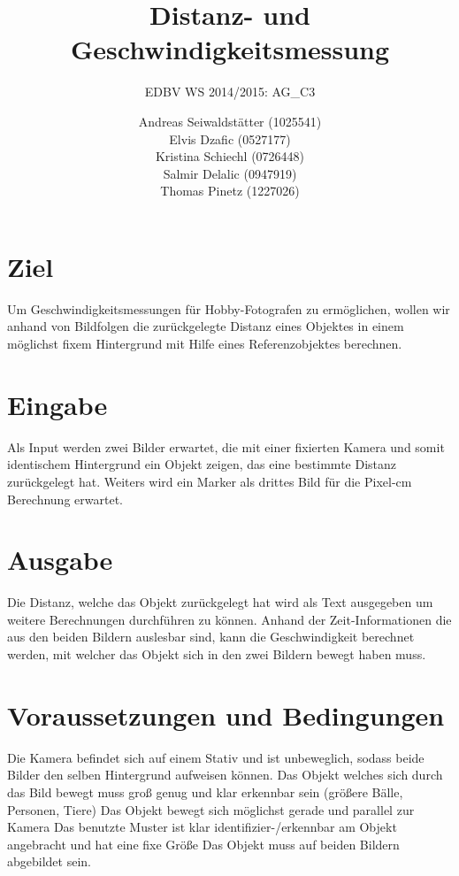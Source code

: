 \documentclass[deutsch]{scrartcl}
\begin{document}
\title{Distanz- und Geschwindigkeitsmessung} 
\subtitle{EDBV WS 2014/2015: AG\_C3}

\author{Andreas Seiwaldstätter (1025541)\\
Elvis Dzafic (0527177)\\
Kristina Schiechl (0726448)\\
Salmir Delalic (0947919)\\
Thomas Pinetz (1227026)}



\maketitle


\section{Ziel}
Um Geschwindigkeitsmessungen für Hobby-Fotografen zu ermöglichen, wollen wir anhand von Bildfolgen die zurückgelegte Distanz eines Objektes in einem möglichst fixem Hintergrund mit Hilfe eines Referenzobjektes berechnen.

\section{Eingabe}
Als Input werden zwei Bilder erwartet, die mit einer fixierten Kamera und somit identischem Hintergrund ein Objekt zeigen, das eine bestimmte Distanz zurückgelegt hat.
Weiters wird ein Marker als drittes Bild für die Pixel-cm Berechnung erwartet.

\section{Ausgabe}
Die Distanz, welche das Objekt zurückgelegt hat wird als Text ausgegeben um weitere Berechnungen durchführen zu können. Anhand der Zeit-Informationen die aus den beiden Bildern auslesbar sind, kann die Geschwindigkeit berechnet werden, mit welcher das Objekt sich in den zwei Bildern bewegt haben muss.

\section{Voraussetzungen und Bedingungen}
Die Kamera befindet sich auf einem Stativ und ist unbeweglich, sodass beide Bilder den selben Hintergrund aufweisen können.
Das Objekt welches sich durch das Bild bewegt muss groß genug und klar erkennbar sein (größere Bälle, Personen, Tiere)
Das Objekt bewegt sich möglichst gerade und parallel zur Kamera
Das benutzte Muster ist klar identifizier-/erkennbar am Objekt angebracht und hat eine fixe Größe
Das Objekt muss auf beiden Bildern abgebildet sein.
\end{document}
